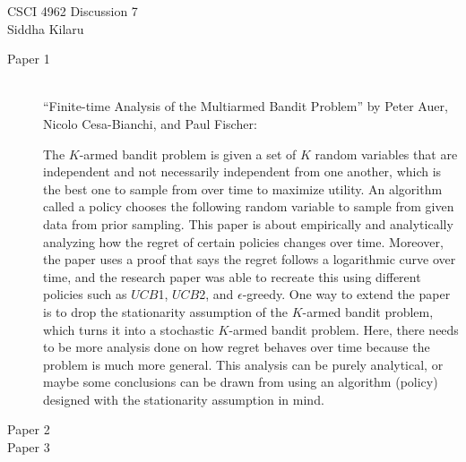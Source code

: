 \documentclass[12pt]{article}
\begin{document}
\noindent CSCI 4962 \hfill Discussion 7 \\
Siddha Kilaru \\

\begin{description}
    \item[Paper 1] \hfill \\
    ``Finite-time Analysis of the Multiarmed Bandit Problem'' by Peter Auer,
    Nicolo Cesa-Bianchi, and Paul Fischer:

    The $K$-armed bandit problem is given a set of $K$ random variables that
    are independent and not necessarily independent from one another, which is
    the best one to sample from over time to maximize utility. An algorithm
    called a policy chooses the following random variable to sample from given
    data from prior sampling. This paper is about empirically and analytically
    analyzing how the regret of certain policies changes over time. Moreover,
    the paper uses a proof that says the regret follows a logarithmic curve
    over time, and the research paper was able to recreate this using different
    policies such as $UCB$1, $UCB$2, and $\epsilon$-greedy. One way to extend
    the paper is to drop the stationarity assumption of the $K$-armed bandit
    problem, which turns it into a stochastic $K$-armed bandit problem. Here,
    there needs to be more analysis done on how regret behaves over time
    because the problem is much more general. This analysis can be purely
    analytical, or maybe some conclusions can be drawn from using an algorithm
    (policy) designed with the stationarity assumption in mind.
    \item[Paper 2]
    \item[Paper 3]

    

\end{description}
\end{document}
